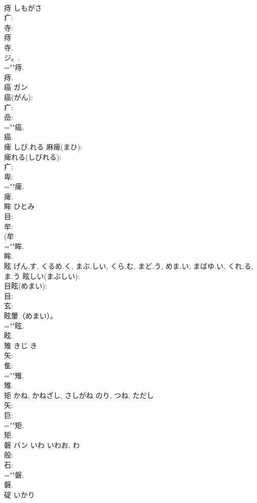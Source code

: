 \documentclass[8pt]{extreport}
\begin{document}
\begin{CJK}{UTF8}{min}
\\	痔		しもがさ				
\\	疒: 
\\	寺: 
\\	痔 
\\	寺.
\\	ジ。.
\\	=""痔.
\\	痔.
\\	癌	ガン			
\\	癌(がん): 
\\	疒: 
\\	嵒: 
\\	=""癌.
\\	癌.
\\	痺		しび.れる			麻痺(まひ): 
\\	痺れる(しびれる): 
\\	疒: 
\\	卑: 
\\	=""痺.
\\	痺.
\\	眸		ひとみ				
\\	目: 
\\	牟: 
\\	(牟 
\\	=""眸.
\\	眸.
\\	眩		げん.す, くるめ.く, まぶ.しい, くら.む, まど.う, めま.い, まばゆ.い, くれ.る, ま.う			眩しい(まぶしい): 
\\	目眩(めまい): 
\\	目: 
\\	玄: 
\\	眩暈（めまい）。 
\\	=""眩.
\\	眩.
\\	雉		きじ	き			
\\	矢: 
\\	隹: 
\\	=""雉.
\\	雉.
\\	矩		かね, かねざし, さしがね	のり, つね, ただし			
\\	矢: 
\\	巨: 
\\	=""矩.
\\	矩.
\\	磐	バン	いわ	いわお, わ	
\\	般: 
\\	石: 
\\	=""磐.
\\	磐.
\\	碇		いかり				

\end{CJK}
\end{document}
